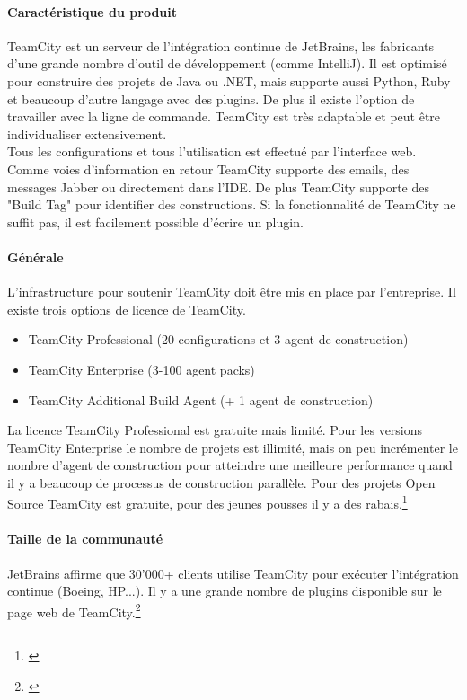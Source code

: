 \paragraph{Caractéristique du produit} TeamCity est un serveur de l'intégration continue de JetBrains, les fabricants d'une grande nombre d'outil de développement (comme IntelliJ). Il est optimisé pour construire des projets de Java ou .NET, mais supporte aussi Python, Ruby et beaucoup d'autre langage avec des plugins. De plus il existe l'option de travailler avec la ligne de commande. TeamCity est très adaptable et peut être individualiser extensivement. \\
Tous les configurations et tous l'utilisation est effectué par l'interface web. Comme voies d'information en retour TeamCity supporte des emails, des messages Jabber ou directement dans l'IDE. De plus TeamCity supporte des "Build Tag" pour identifier des constructions. Si la fonctionnalité de TeamCity ne suffit pas, il est facilement possible d'écrire un plugin.

\paragraph{Générale} L'infrastructure pour soutenir TeamCity doit être mis en place par l'entreprise. Il existe trois options de licence de TeamCity.
\begin{itemize}
	\item TeamCity Professional (20 configurations et 3 agent de construction)
	\item TeamCity Enterprise (3-100 agent packs)
	\item TeamCity Additional Build Agent (+ 1 agent de construction)
\end{itemize}
La licence TeamCity Professional est gratuite mais limité. Pour les versions TeamCity Enterprise le nombre de projets est illimité, mais on peu incrémenter le nombre d'agent de construction pour atteindre une meilleure performance quand il y a beaucoup de processus de construction parallèle. Pour des projets Open Source TeamCity est gratuite, pour des jeunes pousses il y a des rabais.\footnote{\citep{teamcitybuy}}
\paragraph{Taille de la communauté}
JetBrains affirme que 30'000+ clients utilise TeamCity pour exécuter l'intégration continue (Boeing, HP...). Il y a une grande nombre de plugins disponible sur le page web de TeamCity.\footnote{\citep{teamcityplugins}}
